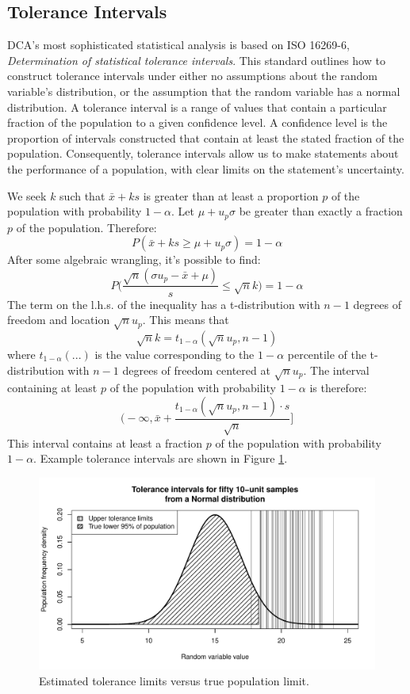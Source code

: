 \documentclass[11pt,a4paper,article]{memoir} %
\begin{document}
\subsection*{Tolerance Intervals}
DCA's most sophisticated statistical analysis is based on ISO 16269-6, \emph{Determination of statistical tolerance intervals}. This standard outlines how to construct tolerance intervals under either no assumptions about the random variable's distribution, or the assumption that the random variable has a normal distribution. A tolerance interval is a range of values that contain a particular fraction of the population to a given confidence level. A confidence level is the proportion of intervals constructed that contain at least the stated fraction of the population. Consequently, tolerance intervals allow us to make statements about the performance of a population, with clear limits on the statement's uncertainty.
\par
We seek $k$ such that $\bar{x} + ks$ is greater than at least a proportion $p$ of the population with probability $1 - \alpha$. Let $\mu + u_p \sigma$ be greater than exactly a fraction $p$ of the population. Therefore:
\[
	P(\bar{x} + ks \geq \mu + u_p \sigma) = 1 - \alpha
\]
After some algebraic wrangling, it's possible to find:
\[
	P\Big(\frac{\sqrt{n}(\sigma u_p - \bar{x} + \mu)}{s} \leq \sqrt{n}k\Big) = 1 - \alpha
\]
The term on the l.h.s. of the inequality has a t-distribution with $n - 1$ degrees of freedom and location $\sqrt{n}u_p$. This means that 
\[
	\sqrt{n}k = t_{1 - \alpha}(\sqrt{n}u_p, n - 1)
\]
where $t_{1 - \alpha}(...)$ is the value corresponding to the $1 - \alpha$ percentile of the t-distribution with $n - 1$ degrees of freedom centered at $\sqrt{n}u_p$. The interval containing at least $p$ of the population with probability $1 - \alpha$ is therefore:
\[
	\Big(-\infty, \bar{x} + \frac{t_{1 - \alpha}(\sqrt{n}u_p, n - 1)\cdot s}{\sqrt{n}}\Big]
\]
This interval contains at least a fraction $p$ of the population with probability $1 - \alpha$. Example tolerance intervals are shown in Figure \ref{fig:tolerance_intervals}.
\begin{figure}[H]
\includegraphics[width=\textwidth]{tolerance_intervals.pdf}
\caption{Estimated tolerance limits versus true population limit.}
\label{fig:tolerance_intervals}
\end{figure}
\par
\newpage
\end{document}
